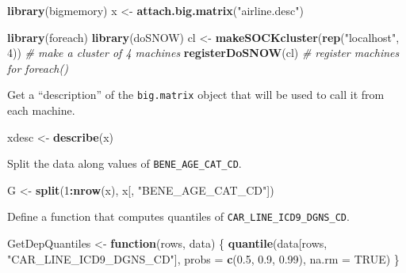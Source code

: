 \documentclass[]{book}
\newenvironment{Shaded}{\begin{snugshade}}{\end{snugshade}}
\newcommand{\CommentTok}[1]{\textcolor[rgb]{0.56,0.35,0.01}{\textit{#1}}}
\newcommand{\ControlFlowTok}[1]{\textcolor[rgb]{0.13,0.29,0.53}{\textbf{#1}}}
\newcommand{\DataTypeTok}[1]{\textcolor[rgb]{0.13,0.29,0.53}{#1}}
\newcommand{\DecValTok}[1]{\textcolor[rgb]{0.00,0.00,0.81}{#1}}
\newcommand{\FloatTok}[1]{\textcolor[rgb]{0.00,0.00,0.81}{#1}}
\newcommand{\KeywordTok}[1]{\textcolor[rgb]{0.13,0.29,0.53}{\textbf{#1}}}
\newcommand{\NormalTok}[1]{#1}
\newcommand{\OperatorTok}[1]{\textcolor[rgb]{0.81,0.36,0.00}{\textbf{#1}}}
\newcommand{\OtherTok}[1]{\textcolor[rgb]{0.56,0.35,0.01}{#1}}
\newcommand{\StringTok}[1]{\textcolor[rgb]{0.31,0.60,0.02}{#1}}
\theoremstyle{definition}
\theoremstyle{definition}
\theoremstyle{definition}
\theoremstyle{remark}
\begin{document}
\begin{Shaded}
\begin{Highlighting}[]
\KeywordTok{library}\NormalTok{(bigmemory)}
\NormalTok{x <-}\StringTok{ }\KeywordTok{attach.big.matrix}\NormalTok{(}\StringTok{"airline.desc"}\NormalTok{)}

\KeywordTok{library}\NormalTok{(foreach)}
\KeywordTok{library}\NormalTok{(doSNOW)}
\NormalTok{cl <-}\StringTok{ }\KeywordTok{makeSOCKcluster}\NormalTok{(}\KeywordTok{rep}\NormalTok{(}\StringTok{"localhost"}\NormalTok{, }\DecValTok{4}\NormalTok{)) }\CommentTok{# make a cluster of 4 machines}
\KeywordTok{registerDoSNOW}\NormalTok{(cl) }\CommentTok{# register machines for foreach()}
\end{Highlighting}
\end{Shaded}

Get a ``description'' of the \texttt{big.matrix} object that will be used to call it from each machine.

\begin{Shaded}
\begin{Highlighting}[]
\NormalTok{xdesc <-}\StringTok{ }\KeywordTok{describe}\NormalTok{(x) }
\end{Highlighting}
\end{Shaded}

Split the data along values of \texttt{BENE\_AGE\_CAT\_CD}.

\begin{Shaded}
\begin{Highlighting}[]
\NormalTok{G <-}\StringTok{ }\KeywordTok{split}\NormalTok{(}\DecValTok{1}\OperatorTok{:}\KeywordTok{nrow}\NormalTok{(x), x[, }\StringTok{"BENE_AGE_CAT_CD"}\NormalTok{]) }
\end{Highlighting}
\end{Shaded}

Define a function that computes quantiles of \texttt{CAR\_LINE\_ICD9\_DGNS\_CD}.

\begin{Shaded}
\begin{Highlighting}[]
\NormalTok{GetDepQuantiles <-}\StringTok{ }\ControlFlowTok{function}\NormalTok{(rows, data) \{}
 \KeywordTok{quantile}\NormalTok{(data[rows, }\StringTok{"CAR_LINE_ICD9_DGNS_CD"}\NormalTok{], }\DataTypeTok{probs =} \KeywordTok{c}\NormalTok{(}\FloatTok{0.5}\NormalTok{, }\FloatTok{0.9}\NormalTok{, }\FloatTok{0.99}\NormalTok{),}
 \DataTypeTok{na.rm =} \OtherTok{TRUE}\NormalTok{)}
\NormalTok{\}}
\end{Highlighting}
\end{Shaded}
\end{document}
